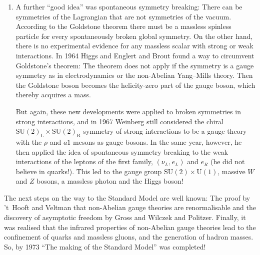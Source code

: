 \documentclass[12pt]{report}
\newcommand{\2}{\ensuremath{\sqrt{2}\,}}
\begin{document}
{\begin{enumerate}
           But all physical applications of non-Abelian gauge theories seemed to require massive
           vector bosons because no massless ones had been found, neither in strong nor weak 
           interactions. Such mass terms had to be inserted by hand, breaking explicitly the 
           local gauge symmetry and thereby destroying the rationale for introducing non-Abelian
           local symmetries in the first place. Furthermore, it was realized that non-Abelian gauge
           theories with mass terms would be non-renormalisable, plagued by the same divergencies as
           the four-fermion theory of weak interactions.


        \item A further ``good idea'' was spontaneous symmetry breaking: There can be symmetries of
           the Lagrangian that are not symmetries of the vacuum.  According to the Goldstone
           theorem there must be a massless spinless particle for every spontaneously broken global 
           symmetry. On the other hand, there is no experimental evidence for any massless scalar 
           with strong or weak interactions. In 1964 Higgs and Englert and Brout found a way to
           circumvent Goldstone's theorem: The theorem does not apply if the symmetry is a gauge
           symmetry as in electrodynamics or the non-Abelian Yang--Mills theory. Then the Goldstone
           boson becomes the helicity-zero part of the gauge boson, which thereby acquires a mass.   

           But again, these new developments were applied to broken symmetries in strong interactions,
           and in 1967 Weinberg still considered the chiral  
           $\mathrm{SU(2)}_\text{L}\times\mathrm{SU(2)}_\text{R}$ symmetry of strong interactions
           to be a gauge theory with the $\rho$ and $a1$ mesons as gauge bosons. In the same year,
           however, 
           he then applied the idea of spontaneous symmetry breaking to the weak interactions of
           the leptons of the first family, $(\nu_L, e_L)$ and $e_R$ (he did not believe in quarks!).
           This led to the gauge group $\mathrm{SU(2)}\times\mathrm{U(1)}$, massive $W$ and
           $Z$ bosons, a massless photon and the Higgs boson! 

      \end{enumerate}
           The next steps on the way to the Standard Model are well known: The proof by 't~Hooft
           and Veltman that non-Abelian gauge theories are renormalisable and  the discovery of
           asymptotic freedom by Gross and Wilczek and Politzer. Finally, it was realised that the
           infrared properties of non-Abelian gauge theories lead to the confinement of quarks and
           massless gluons, and the generation of hadron masses. So, by 1973 ``The making of the
           Standard Model'' was completed!

}
\end{document}
